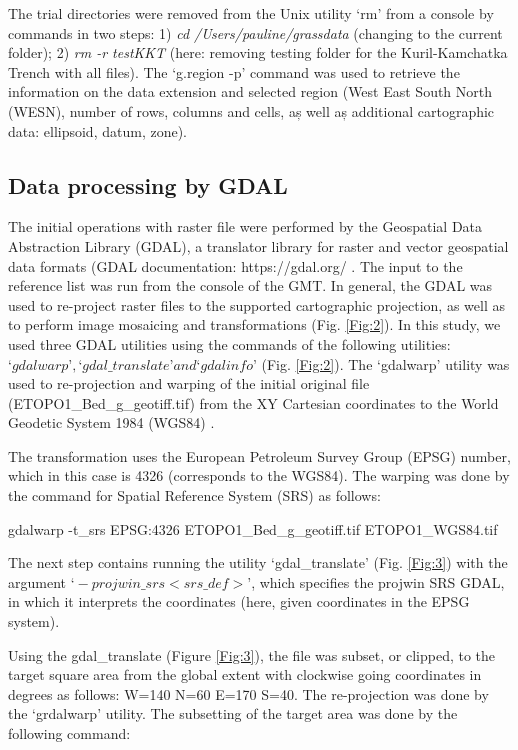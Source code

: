 \documentclass[technologies,article,submit,pdftex,moreauthors]{Definitions/mdpi}
\begin{document}
The trial directories were removed from the Unix utility ‘rm’ from a console by commands in two steps: 1) \emph{cd /Users/pauline/grassdata} (changing to the current folder); 2) \emph{rm -r testKKT} (here: removing testing folder for the Kuril-Kamchatka Trench with all files).
The ‘g.region -p’ command was used to retrieve the information on the data extension and selected region (West East South North (WESN), number of rows, columns and cells, aș well aș additional cartographic data: ellipsoid, datum, zone). 

\subsection{Data processing by GDAL}

The initial operations with raster file were performed by the Geospatial Data Abstraction Library (GDAL), a translator library for raster and vector geospatial data formats (GDAL documentation: https://gdal.org/ . The input to the reference list \cite{GDAL/OGR} was run from the console of the GMT. In general, the GDAL was used to re-project raster files to the supported cartographic projection, as well as to perform image mosaicing and transformations (Fig. \ref{Fig:2}). In this study, we used three GDAL utilities using the commands of the following utilities:\\ 
$‘gdalwarp’, ‘gdal\_translate’ and ‘gdalinfo’$ (Fig. \ref{Fig:2}). The ‘gdalwarp’ utility was used to re-projection and warping of the initial original file (ETOPO1\_Bed\_g\_geotiff.tif) from the XY Cartesian coordinates to the World Geodetic System 1984 (WGS84) \cite{Defense}. 

The transformation uses the European Petroleum Survey Group (EPSG) number, which in this case is 4326 (corresponds to the WGS84). The warping was done by the command for Spatial Reference System (SRS) as follows: 

\begin{spverbatim}
gdalwarp -t_srs EPSG:4326 ETOPO1_Bed_g_geotiff.tif ETOPO1_WGS84.tif
\end{spverbatim} 

The next step contains running the utility ‘gdal\_translate’  (Fig. \ref{Fig:3}) with the argument $‘-projwin\_srs <srs\_def>’$, which specifies the projwin SRS GDAL, in which it interprets the coordinates (here, given coordinates in the EPSG system). 

Using the gdal\_translate (Figure \ref{Fig:3}), the file was subset, or clipped, to the target square area from the global extent with clockwise going coordinates in degrees as follows: W=140 N=60 E=170 S=40. The re-projection was done by the ‘grdalwarp’ utility. The subsetting of the target area was done by the following command: 
\end{document}
